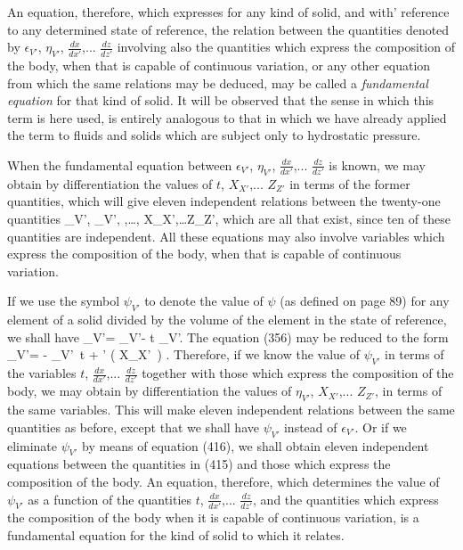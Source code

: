 \documentclass[12pt]{memoir}
\begin{document}
{An equation, therefore, which expresses for any kind of solid, and with' reference to any determined state of reference, the relation between the quantities denoted by $\epsilon_{V'}$, $\eta_{V'}$, $\frac{dx}{dx'}$,... $\frac{dz}{dz'}$ involving also the quantities which express the composition of the body, when that is capable of continuous variation, or any other equation from which the same relations may be deduced, may be called a \textit{fundamental equation} for that kind of solid. It will be observed that the sense in which this term is here used, is entirely analogous to that in which we have already applied the term to fluids and solids which are subject only to hydrostatic pressure.


When the fundamental equation between $\epsilon_{V'}$, $\eta_{V'}$, $\frac{dx}{dx'}$,... $\frac{dz}{dz'}$ is known, we may obtain by differentiation the values of $t$, $X_{X'}$,... $Z_{Z'}$ in terms of the former quantities, which will give eleven independent relations between the twenty-one quantities
\eqs \epsilon_{V'}, \eta_{V'}, ,\dots {}, X_{X'},\dots Z_{Z'},  \label{415}\eqe
which are all that exist, since ten of these quantities are independent. All these equations may also involve variables which express the composition of the body, when that is capable of continuous variation.


If we use the symbol $\psi_{V'}$ to denote the value of $\psi$ (as defined on page 89) for any element of a solid divided by the volume of the element in the state of reference, we shall have
\eqs \psi_{V'}= \epsilon_{V'}- t \eta_{V'}.   \label{416}\eqe
The equation (356) may be reduced to the form
\eqs \delta \psi_{V'}= - \eta_{V'}\, \delta t +
\sum \sum\nolimits' \left( X_{X'} \,\delta {}\right) .  \label{417}\eqe
Therefore, if we know the value of $\psi_{V'}$ in terms of the variables $t$, $\frac{dx}{dx'}$,... $\frac{dz}{dz'}$ together with those which express the composition of the body, we may obtain by differentiation the values of $\eta_{V'}$, $X_{X'}$,... $Z_{Z'}$, in terms of the same variables. This will make eleven independent relations between the same quantities as before, except that we shall have $\psi_{V'}$ instead of $\epsilon_{V'}$. Or if we eliminate $\psi_{V'}$ by means of equation (416), we shall obtain eleven independent equations between the quantities in (415) and those which express the composition of the body. An equation, therefore, which determines the value of $\psi_{V'}$ as a function of the quantities $t$, $\frac{dx}{dx'}$,... $\frac{dz}{dz'}$, and the quantities which express the composition of the body when it is capable of continuous variation, is a fundamental equation for the kind of solid to which it relates.


}
\end{document}
